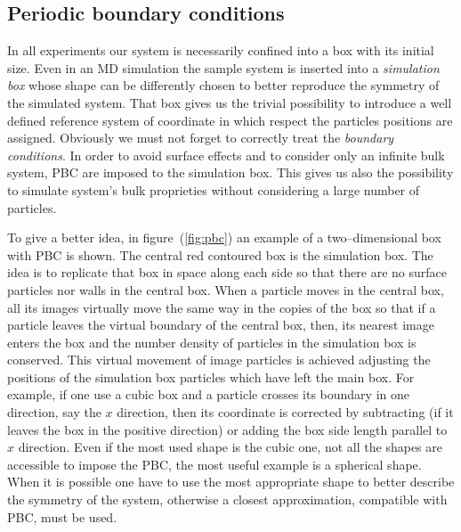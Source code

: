 \subsection{Periodic boundary conditions}
In all experiments our system is necessarily confined into a box with its initial size. Even in an \ac{MD} simulation the sample system is inserted into a \textit{simulation box} whose shape can be differently chosen to better reproduce the symmetry of the simulated system. That box gives us the trivial possibility to introduce a well defined reference system of coordinate in which respect the particles positions are assigned. Obviously we must not forget to correctly treat the \textit{boundary conditions}. In order to avoid surface effects and to consider only an infinite bulk system, \ac{PBC} are imposed to the simulation box. This gives us also the possibility to simulate system's bulk proprieties without considering a large number of particles.
\begin{SCfigure}
\caption{Schematic view of a two--dimensional box with \acs{PBC} imposed. The central, red contoured, box is the simulation box and it is replicated along each side.}
\label{fig:pbc}
\end{SCfigure}
To give a better idea, in figure~(\ref{fig:pbc}) an example of a two--dimensional box with \ac{PBC} is shown. The central red contoured box is the simulation box. The idea is to replicate that box in space along each side so that there are no surface particles nor walls in the central box. When a particle moves in the central box, all its images virtually move the same way in the copies of the box so that if a particle leaves the virtual boundary of the central box, then, its nearest image enters the box and the number density of particles in the simulation box is conserved.
This virtual movement of image particles is achieved adjusting the positions of the simulation box particles which have left the main box. For example, if one use a cubic box and a particle crosses its boundary in one direction, say the $x$ direction, then its coordinate is corrected by subtracting (if it leaves the box in the positive direction) or adding the box side length parallel to $x$ direction. Even if the most used shape is the cubic one, not all the shapes are accessible to impose the \ac{PBC}, the most useful example is a spherical shape. When it is possible one have to use the most appropriate shape to better describe the symmetry of the system, otherwise a closest approximation, compatible with \ac{PBC}, must be used.

